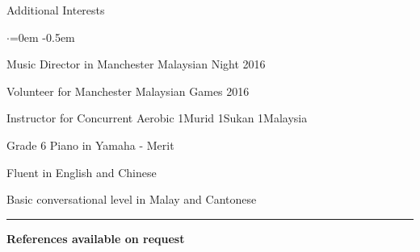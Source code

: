 \documentclass{techresume} %
\begin{document}
\begin{rSection}{Additional Interests}

\begin{list}{$\cdot$}{\leftmargin=0em}
\itemsep -0.5em
\item Music Director in Manchester Malaysian Night 2016
\item Volunteer for Manchester Malaysian Games 2016
\item Instructor for Concurrent Aerobic 1Murid 1Sukan 1Malaysia
\item Grade 6 Piano in Yamaha - Merit
\item Fluent in English and Chinese
\item Basic conversational level in Malay and Cantonese
\end{list}

\end{rSection}


\sectionskip
\sectionlineskip
\hrule
{\bf References available on request}
\end{document}
